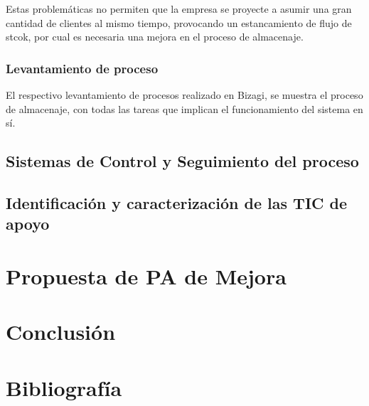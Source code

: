Estas problemáticas no permiten que la empresa se proyecte a asumir una gran cantidad de clientes al mismo tiempo, provocando un estancamiento de flujo de stcok, por cual es necesaria una mejora en el proceso de almacenaje.
    \subsubsection{Levantamiento de proceso}
    El respectivo levantamiento de procesos realizado en Bizagi, se muestra el proceso de almacenaje, con todas las tareas que implican el funcionamiento del sistema en sí.

	\subsection{Sistemas de Control y Seguimiento del proceso}
	\subsection{Identificación y caracterización de las TIC de apoyo}
\section{Propuesta de PA de Mejora}
\section{Conclusión}
\section{Bibliografía}

	

